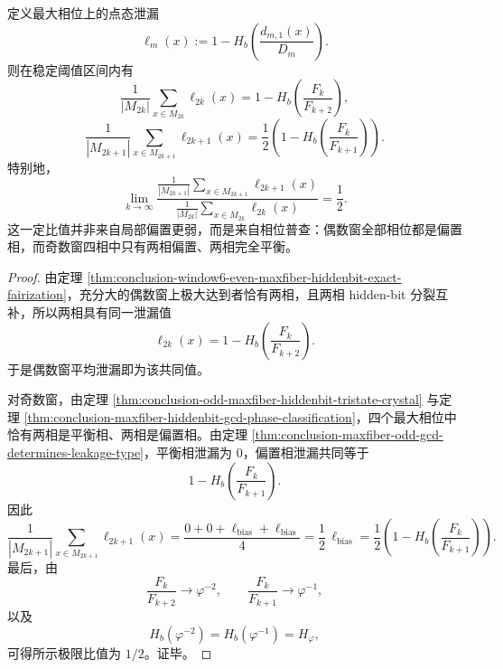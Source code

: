\begin{proposition}[奇偶泄漏常数的精确二分之一律来自相位普查]\label{prop:conclusion-maxfiber-half-law-from-phase-census}
定义最大相位上的点态泄漏
\[
\ell_m(x):=1-H_b\!\left(\frac{d_{m,1}(x)}{D_m}\right).
\]
则在稳定阈值区间内有
\[
\frac1{|M_{2k}|}\sum_{x\in M_{2k}}\ell_{2k}(x)
=
1-H_b\!\left(\frac{F_k}{F_{k+2}}\right),
\]
\[
\frac1{|M_{2k+1}|}\sum_{x\in M_{2k+1}}\ell_{2k+1}(x)
=
\frac12\left(
1-H_b\!\left(\frac{F_k}{F_{k+1}}\right)
\right).
\]
特别地，
\[
\lim_{k\to\infty}
\frac{
\frac1{|M_{2k+1}|}\sum_{x\in M_{2k+1}}\ell_{2k+1}(x)
}{
\frac1{|M_{2k}|}\sum_{x\in M_{2k}}\ell_{2k}(x)
}
=\frac12.
\]
这一定比值并非来自局部偏置更弱，而是来自相位普查：偶数窗全部相位都是偏置相，而奇数窗四相中只有两相偏置、两相完全平衡。
\end{proposition}
\begin{proof}
由定理 \ref{thm:conclusion-window6-even-maxfiber-hiddenbit-exact-fairization}，充分大的偶数窗上极大达到者恰有两相，且两相 hidden-bit 分裂互补，所以两相具有同一泄漏值
\[
\ell_{2k}(x)=1-H_b\!\left(\frac{F_k}{F_{k+2}}\right).
\]
于是偶数窗平均泄漏即为该共同值。

对奇数窗，由定理 \ref{thm:conclusion-odd-maxfiber-hiddenbit-tristate-crystal} 与定理 \ref{thm:conclusion-maxfiber-hiddenbit-gcd-phase-classification}，四个最大相位中恰有两相是平衡相、两相是偏置相。由定理 \ref{thm:conclusion-maxfiber-odd-gcd-determines-leakage-type}，平衡相泄漏为 \(0\)，偏置相泄漏共同等于
\[
1-H_b\!\left(\frac{F_k}{F_{k+1}}\right).
\]
因此
\[
\frac1{|M_{2k+1}|}\sum_{x\in M_{2k+1}}\ell_{2k+1}(x)
=
\frac{0+0+\ell_{\mathrm{bias}}+\ell_{\mathrm{bias}}}{4}
=
\frac12\,\ell_{\mathrm{bias}}
=
\frac12\left(
1-H_b\!\left(\frac{F_k}{F_{k+1}}\right)
\right).
\]
最后，由
\[
\frac{F_k}{F_{k+2}}\to \varphi^{-2},
\qquad
\frac{F_k}{F_{k+1}}\to \varphi^{-1},
\]
以及
\[
H_b(\varphi^{-2})=H_b(\varphi^{-1})=H_\varphi,
\]
可得所示极限比值为 \(1/2\)。证毕。
\end{proof}
